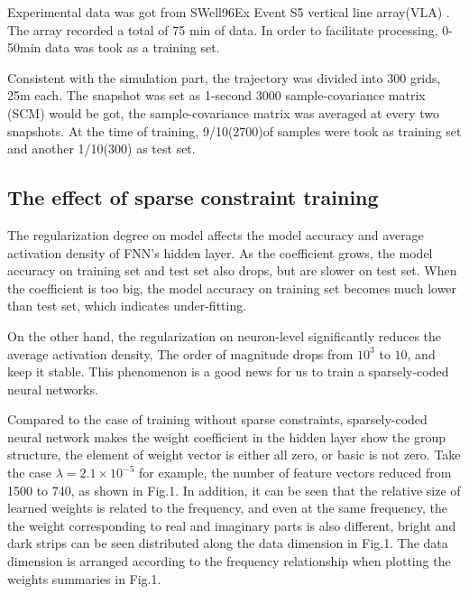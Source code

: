 Experimental data was got from SWell96Ex Event S5 vertical line array(VLA) . The array recorded a total of 75 min of data. In order to facilitate processing, 0\--50min data was took as a training set.

Consistent with the simulation part, the trajectory was divided into 300 grids, 25m each. The snapshot was set as 1-second 3000 sample-covariance matrix (SCM) would be got, the sample-covariance matrix was averaged at every two snapshots.
At the time of training, 9/10(2700)of samples were took as training set and another 1/10(300) as test set.

\subsection{The effect of sparse constraint training}
The regularization degree on model affects the model accuracy and average activation density of FNN's hidden layer. As the coefficient grows, the model accuracy on training set and test set also drops, but are slower on test set. When the coefficient is too big, the model accuracy on training set becomes much lower than test set, which indicates under-fitting.

On the other hand, the regularization on neuron-level significantly reduces the average activation density,
The order of magnitude drops from $10^{3}$ to $10$, and keep it stable. This phenomenon is a good news for us to train a sparsely-coded neural networks.

Compared to the case of training without sparse constraints, sparsely-coded neural network makes the weight coefficient in the hidden layer show the group structure, the element of weight vector is either all zero, or basic is not zero. Take the case $\lambda=2.1 \times 10^{-5} $
for example, the number of feature vectors reduced from 1500 to 740, as shown in Fig.1. In addition, it can be seen that the relative size of learned weights is related to the frequency, and even at the same frequency, the the weight corresponding
to real and imaginary parts is also different, bright and dark strips can be seen distributed along the data dimension in Fig.1. The data dimension is arranged according to the frequency relationship when plotting the weights summaries in Fig.1.

